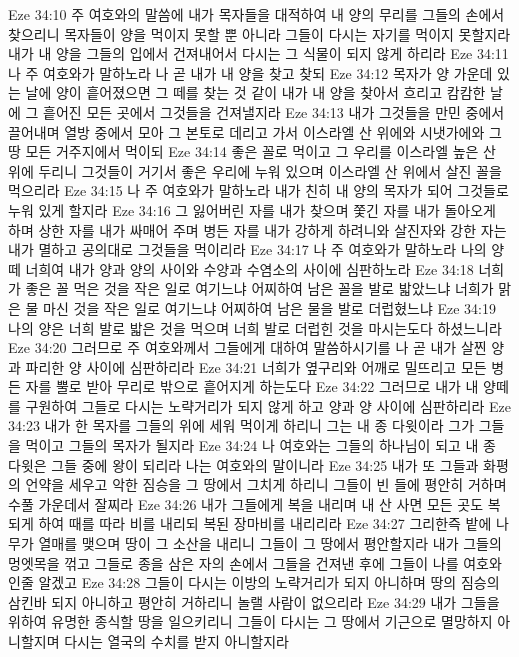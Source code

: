 Eze 34:10  주 여호와의 말씀에 내가 목자들을 대적하여 내 양의 무리를 그들의 손에서 찾으리니 목자들이 양을 먹이지 못할 뿐 아니라 그들이 다시는 자기를 먹이지 못할지라 내가 내 양을 그들의 입에서 건져내어서 다시는 그 식물이 되지 않게 하리라
Eze 34:11  나 주 여호와가 말하노라 나 곧 내가 내 양을 찾고 찾되
Eze 34:12  목자가 양 가운데 있는 날에 양이 흩어졌으면 그 떼를 찾는 것 같이 내가 내 양을 찾아서 흐리고 캄캄한 날에 그 흩어진 모든 곳에서 그것들을 건져낼지라
Eze 34:13  내가 그것들을 만민 중에서 끌어내며 열방 중에서 모아 그 본토로 데리고 가서 이스라엘 산 위에와 시냇가에와 그 땅 모든 거주지에서 먹이되
Eze 34:14  좋은 꼴로 먹이고 그 우리를 이스라엘 높은 산 위에 두리니 그것들이 거기서 좋은 우리에 누워 있으며 이스라엘 산 위에서 살진 꼴을 먹으리라
Eze 34:15  나 주 여호와가 말하노라 내가 친히 내 양의 목자가 되어 그것들로 누워 있게 할지라
Eze 34:16  그 잃어버린 자를 내가 찾으며 쫓긴 자를 내가 돌아오게 하며 상한 자를 내가 싸매어 주며 병든 자를 내가 강하게 하려니와 살진자와 강한 자는 내가 멸하고 공의대로 그것들을 먹이리라
Eze 34:17  나 주 여호와가 말하노라 나의 양떼 너희여 내가 양과 양의 사이와 수양과 수염소의 사이에 심판하노라
Eze 34:18  너희가 좋은 꼴 먹은 것을 작은 일로 여기느냐 어찌하여 남은 꼴을 발로 밟았느냐 너희가 맑은 물 마신 것을 작은 일로 여기느냐 어찌하여 남은 물을 발로 더럽혔느냐
Eze 34:19  나의 양은 너희 발로 밟은 것을 먹으며 너희 발로 더럽힌 것을 마시는도다 하셨느니라
Eze 34:20  그러므로 주 여호와께서 그들에게 대하여 말씀하시기를 나 곧 내가 살찐 양과 파리한 양 사이에 심판하리라
Eze 34:21  너희가 옆구리와 어깨로 밀뜨리고 모든 병든 자를 뿔로 받아 무리로 밖으로 흩어지게 하는도다
Eze 34:22  그러므로 내가 내 양떼를 구원하여 그들로 다시는 노략거리가 되지 않게 하고 양과 양 사이에 심판하리라
Eze 34:23  내가 한 목자를 그들의 위에 세워 먹이게 하리니 그는 내 종 다윗이라 그가 그들을 먹이고 그들의 목자가 될지라
Eze 34:24  나 여호와는 그들의 하나님이 되고 내 종 다윗은 그들 중에 왕이 되리라 나는 여호와의 말이니라
Eze 34:25  내가 또 그들과 화평의 언약을 세우고 악한 짐승을 그 땅에서 그치게 하리니 그들이 빈 들에 평안히 거하며 수풀 가운데서 잘찌라
Eze 34:26  내가 그들에게 복을 내리며 내 산 사면 모든 곳도 복되게 하여 때를 따라 비를 내리되 복된 장마비를 내리리라
Eze 34:27  그리한즉 밭에 나무가 열매를 맺으며 땅이 그 소산을 내리니 그들이 그 땅에서 평안할지라 내가 그들의 멍엣목을 꺾고 그들로 종을 삼은 자의 손에서 그들을 건져낸 후에 그들이 나를 여호와인줄 알겠고
Eze 34:28  그들이 다시는 이방의 노략거리가 되지 아니하며 땅의 짐승의 삼킨바 되지 아니하고 평안히 거하리니 놀랠 사람이 없으리라
Eze 34:29  내가 그들을 위하여 유명한 종식할 땅을 일으키리니 그들이 다시는 그 땅에서 기근으로 멸망하지 아니할지며 다시는 열국의 수치를 받지 아니할지라
